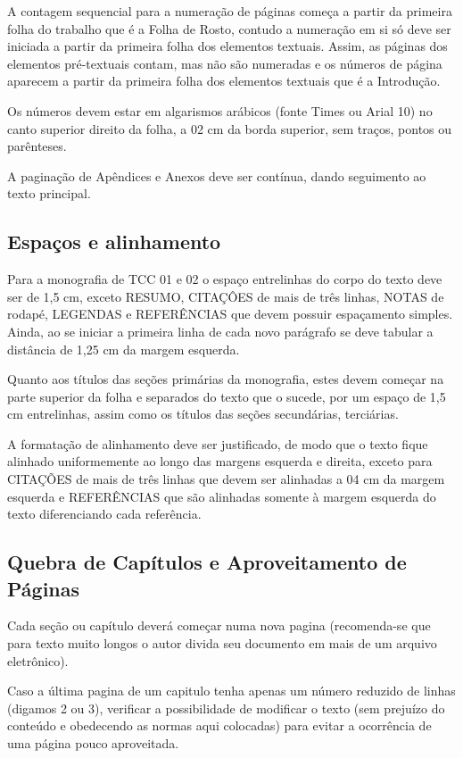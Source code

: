 A contagem sequencial para a numeração de páginas começa a partir da 
primeira folha do trabalho que é a Folha de Rosto, contudo a numeração em 
si só deve ser iniciada a partir da primeira folha dos elementos textuais. 
Assim, as páginas dos elementos pré-textuais contam, mas não são numeradas 
e os números de página aparecem a partir da primeira folha dos elementos 
textuais que é a Introdução. 

Os números devem estar em algarismos arábicos (fonte Times ou Arial 10) no 
canto superior direito da folha, a 02 cm da borda superior, sem traços, 
pontos ou parênteses. 

A paginação de Apêndices e Anexos deve ser contínua, dando seguimento ao 
texto principal.

\subsection{Espaços e alinhamento}

Para a monografia de TCC 01 e 02 o espaço entrelinhas do corpo do texto 
deve ser de 1,5 cm, exceto RESUMO, CITAÇÔES de mais de três linhas, NOTAS 
de rodapé, LEGENDAS e REFERÊNCIAS que devem possuir espaçamento simples. 
Ainda, ao se iniciar a primeira linha de cada novo parágrafo se deve 
tabular a distância de 1,25 cm da margem esquerda.

Quanto aos títulos das seções primárias da monografia, estes devem começar 
na parte superior da folha e separados do texto que o sucede, por um espaço 
de 1,5 cm entrelinhas, assim como os títulos das seções secundárias, 
terciárias. 

A formatação de alinhamento deve ser justificado, de modo que o texto fique 
alinhado uniformemente ao longo das margens esquerda e direita, exceto para 
CITAÇÕES de mais de três linhas que devem ser alinhadas a 04 cm da margem 
esquerda e REFERÊNCIAS que são alinhadas somente à margem esquerda do texto 
diferenciando cada referência.

\subsection{Quebra de Capítulos e Aproveitamento de Páginas}

Cada seção ou capítulo deverá começar numa nova pagina (recomenda-se que 
para texto muito longos o autor divida seu documento em mais de um arquivo 
eletrônico). 

Caso a última pagina de um capitulo tenha apenas um número reduzido de 
linhas (digamos 2 ou 3), verificar a possibilidade de modificar o texto 
(sem prejuízo do conteúdo e obedecendo as normas aqui colocadas) para 
evitar a ocorrência de uma página pouco aproveitada.

